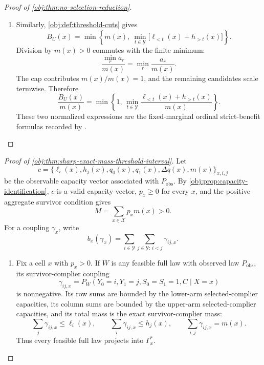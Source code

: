\documentclass[11pt]{article}
\begin{document}
\begin{proof}[Proof of \cref{obj:thm:no-selection-reduction}]
\begin{enumerate}
\item
Similarly, \cref{obj:def:threshold-cuts} gives
\[
B_U(x)
=
\min\left\{
m(x),\
\min_{t\in\mathcal Y}\bigl[\ell_{<t}(x)+h_{>t}(x)\bigr]
\right\}.
\]
Division by \(m(x)>0\) commutes with the finite minimum:
\[
\frac{\min_r a_r}{m(x)}
=
\min_r \frac{a_r}{m(x)}.
\]
The cap contributes \(m(x)/m(x)=1\), and the remaining candidates scale termwise.  Therefore
\[
\frac{B_U(x)}{m(x)}
=
\min\left\{
1,\,
\min_{t\in\mathcal Y}
\frac{\ell_{<t}(x)+h_{>t}(x)}{m(x)}
\right\}.
\]
These two normalized expressions are the fixed-marginal ordinal strict-benefit formulas recorded by \citep[Proposition 2, equation (6), p.~546]{LuDingDasgupta2018}.
\end{enumerate}
\end{proof}

\begin{proof}[Proof of \cref{obj:thm:sharp-exact-mass-threshold-interval}]
Let
\[
c=\{\ell_i(x),h_j(x),q_0(x),q_1(x),\Delta q(x),m(x)\}_{x,i,j}
\]
be the observable capacity vector associated with \(P_{\mathrm{obs}}\).  By
\cref{obj:prop:capacity-identification}, \(c\) is a valid capacity vector,
\(p_x\ge 0\) for every \(x\), and the positive aggregate survivor condition gives
\[
M=\sum_{x\in\mathcal X}p_xm(x)>0 .
\]
For a coupling \(\gamma_x\), write
\[
b_x(\gamma_x)=\sum_{i\in\mathcal Y}\sum_{j\in\mathcal Y:\,i<j}\gamma_{ij,x}.
\]

\begin{enumerate}
\item Fix a cell \(x\) with \(p_x>0\).  If \(W\) is any feasible full law with observed law \(P_{\mathrm{obs}}\), its survivor-complier coupling
\[
\gamma_{ij,x}
=
P_W(Y_0=i,Y_1=j,S_0=S_1=1,C\mid X=x)
\]
is nonnegative.  Its row sums are bounded by the lower-arm selected-complier capacities, its column sums are bounded by the upper-arm selected-complier capacities, and its total mass is the exact survivor-complier mass:
\[
\sum_j\gamma_{ij,x}\le \ell_i(x),\qquad
\sum_i\gamma_{ij,x}\le h_j(x),\qquad
\sum_{i,j}\gamma_{ij,x}=m(x).
\]
Thus every feasible full law projects into \(\Gamma_x^\ast\).


\end{enumerate}
\end{proof}
\end{document}
